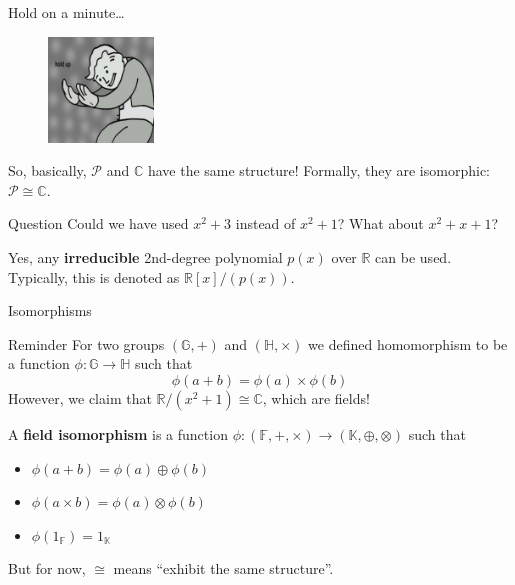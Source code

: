 \documentclass{zkdl-presentation-template}
\begin{document}
    \begin{frame}{Hold on a minute\dots}
        \begin{figure}
            \centering
            \includegraphics[width=0.25\textwidth]{images/lecture_3/hold_up.jpg}
        \end{figure}

        So, basically, $\mathcal{P}$ and $\mathbb{C}$ have the same structure! Formally, they are isomorphic: $\mathcal{P} \cong \mathbb{C}$.

        \begin{alertblock}{Question}
            Could we have used $x^2+3$ instead of $x^2+1$? What about $x^2+x+1$?
        \end{alertblock}

        Yes, any \textbf{irreducible} 2nd-degree polynomial $p(x)$ over $\mathbb{R}$ can be used. Typically, this is denoted as $\boxed{\mathbb{R}[x]/(p(x))}$.
    \end{frame}

    \begin{frame}{Isomorphisms}
        \begin{block}{Reminder}
            For two groups $(\mathbb{G},+)$ and $(\mathbb{H},\times)$ we defined homomorphism to be a function $\phi: \mathbb{G} \to \mathbb{H}$ such that
            \begin{equation*}
                \phi(a+b) = \phi(a) \times \phi(b)
            \end{equation*}
            However, we claim that $\mathbb{R}/(x^2+1) \cong \mathbb{C}$, which are fields!
        \end{block}

        \begin{definition}
            A \textbf{field isomorphism} is a function $\phi: (\mathbb{F},+,\times) \to (\mathbb{K},\oplus,\otimes)$ such that
            \begin{itemize}
                \item $\phi(a+b) = \phi(a) \oplus \phi(b)$
                \item $\phi(a \times b) = \phi(a) \otimes \phi(b)$
                \item $\phi(1_{\mathbb{F}}) = 1_{\mathbb{K}}$
            \end{itemize}

            But for now, $\cong$ means ``exhibit the same structure''. 
        \end{definition}
    \end{frame}
\end{document}
